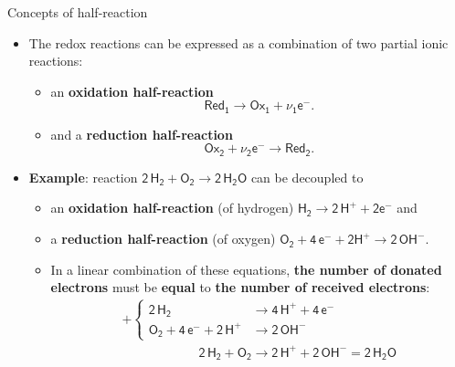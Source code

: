 %
\begin{frame}{Concepts of half-reaction}
	\begin{itemize}
		\item The redox reactions can be expressed as a combination of two partial ionic reactions:
		\begin{itemize}
			\item an \alert{\bf oxidation half-reaction}
			\[
			\mathsf{Red_1 \rightarrow Ox_1 + \nu_1 e^-.}
			\]
			\item and a \alert{\bf reduction half-reaction}
				\[
			\mathsf{Ox_2 + \nu_2 e^- \rightarrow Red_2.}
			\]
		\end{itemize}
		\item \alert{\bf Example}: reaction $\mathsf{2\, H_2 + O_2 \rightarrow 2\, H_2O}$ can be decoupled to
		\begin{itemize}
			\item an \alert{\bf oxidation half-reaction} (of hydrogen) \qquad $\mathsf{H_2 \rightarrow 2\, H^+ + 2 e^-}$ and
			\item a \alert{\bf reduction half-reaction} (of oxygen) \qquad $\mathsf{O_2 + 4\, e^- + 2 H^+ \rightarrow 2\, OH^-.}$
			\item In a linear combination of these equations, 
			{\bf the number of donated electrons} must be {\bf equal} to {\bf the number of received electrons}:
			$$
			\begin{array}{l}
				+
				\begin{cases}
					\mathsf{2 \, H_{2}} & \rightarrow\mathsf{4 \, H^{+}+4 \, e^{-}}\\
					\mathsf{O_{2}+4 \, e^{-}+2 \, H^{+}} & \rightarrow\mathsf{2 \, OH^{-}}
				\end{cases}\\
				\hline \qquad\qquad\qquad\mathsf{2  \,  H_{2}+O_{2} \rightarrow 2 \, H^{+}+2 \, OH^{-} = 2 \, H_{2}O}
			\end{array} 
			$$
		\end{itemize}
	\end{itemize}

\end{frame}
%

